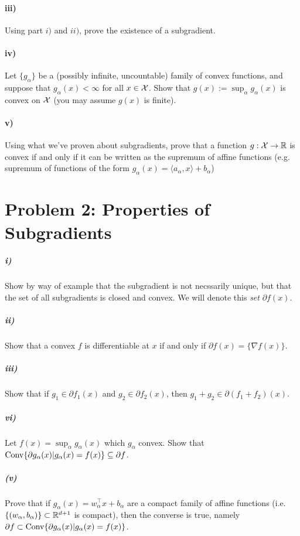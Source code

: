 \documentclass[12pt]{article}
\begin{document}
\paragraph{iii)} Using part $i)$ and $ii)$, prove the existence of a subgradient. 

\paragraph{iv)} Let $\{g_{\alpha}\}$ be a (possibly infinite, uncountable) family of convex functions, and suppose that $g_{\alpha}(x) < \infty$ for all $x \in {\cal X}$. Show that $g(x) := \sup_{\alpha} g_{\alpha}(x)$ is convex on ${\cal X}$ (you may assume $g(x)$ is finite).

\paragraph{v)} Using what we've proven about subgradients, prove that a function $g: {\cal X} \to \mathbb{R}$ is convex if and only if it can be written as the supremum of affine functions (e.g. supremum of functions of the form $g_{\alpha}(x) = \langle a_{\alpha}, x \rangle + b_{\alpha}$)

\section*{Problem 2: Properties of Subgradients}

\subparagraph{i)} Show by way of example that the subgradient is not necssarily unique, but that the set of all subgradients is closed and convex. We will denote this \emph{set} $\partial f(x)$.

\subparagraph{ii)} Show that a convex $f$ is differentiable at $x$ if and only if $\partial f(x) = \{\nabla f(x)\}$. 

\subparagraph{iii)} Show that if $g_1 \in \partial f_1(x)$ and $g_2 \in \partial f_2(x)$, then $g_1 + g_2 \in \partial(f_1 + f_2)(x)$. 



\subparagraph{vi)} Let $f(x) = \sup_{\alpha} g_{\alpha}(x)$ which $g_{\alpha}$ convex. Show that $\mathrm{Conv} \{\partial g_{\alpha}(x) |  g_{\alpha}(x) =f(x) \} \subseteq \partial f$. 

\subparagraph{(v)} Prove that if $g_{\alpha}(x) = w_{\alpha}^\top x + b_{\alpha}$ are a compact family of affine functions (i.e. $\{(w_{\alpha},b_{\alpha})\} \subset \mathbb{R}^{d+1}$ is compact), then the converse is true, namely $\partial f \subset \mathrm{Conv} \{\partial g_{\alpha}(x) |  g_{\alpha}(x) =f(x) \} $. 
\end{document}
